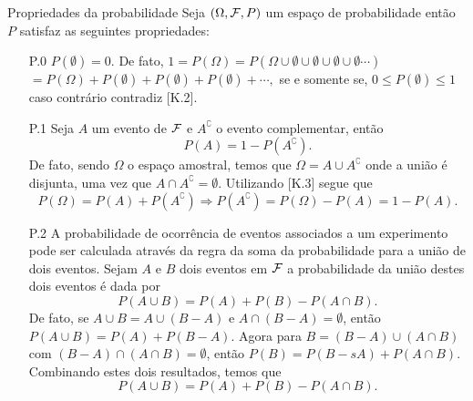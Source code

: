 \begin{frame}{Propriedades da probabilidade}
Seja $(\Omega, {\cal F}, P)$ um espaço de probabilidade então $P$ satisfaz as seguintes propriedades:

\begin{enumerate}
\item[P.0] $P(\emptyset)=0.$ De fato, $1=P(\Omega)=P(\Omega \cup \emptyset \cup \emptyset\cup \emptyset\cup \emptyset \cdots )$ $=P(\Omega)+P(\emptyset)+P(\emptyset)+P(\emptyset)+\cdots,$  se e somente se,  $0 \leq P(\emptyset)\leq 1$ caso contrário contradiz [K.2].

\item[P.1] Seja $A$ um evento de ${\cal F}$  e $A^\complement$ o evento complementar, então $$P(A) = 1 - P\left(A^\complement\right).$$ 
De fato, sendo $ \Omega $ o espaço amostral, temos que $\Omega=A\cup A^\complement$ onde a união é disjunta, uma vez que $ A\cap A^\complement=\emptyset $. Utilizando [K.3]  segue que
$$P(\Omega)=P(A)+P\left(A^\complement\right)\Rightarrow P\left(A^\complement\right)=P(\Omega)-P(A)=1-P(A).$$ 


\item[P.2] A probabilidade de ocorrência de eventos associados a um experimento pode ser calculada através da regra da soma da probabilidade para a união de dois eventos. 
Sejam $A$ e $B$  dois eventos em  ${\cal F}$ a probabilidade da união destes dois eventos  é dada por $$ P(A\cup B) = P(A)+P(B)-P(A\cap B).$$ 
De fato, se $ A\cup B=A\cup (B- A) $ e $ A\cap(B - A)=\emptyset $, então $P(A\cup B)=P(A)+P(B - A).$ Agora para $ B=(B- A)\cup(A\cap B) $ com $ (B - A)\cap(A\cap B)=\emptyset $, então
$P(B)=P(B -s A)+P(A\cap B).$ Combinando estes dois resultados, temos que \[P(A\cup B)=P(A)+P(B)-P(A\cap B).\]
\end{enumerate}
\end{frame}

